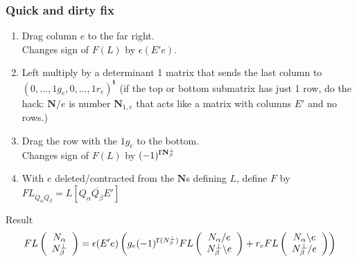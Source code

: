\documentclass{beamer}
\newcommand{\rank}{{\mbox{r}}}%
\begin{document}
\begin{frame}
  \frametitle{Quick and dirty fix}
  \begin{enumerate}
  \item Drag column $e$ to the far right.\\
    Changes sign of $F(L)$ by $\epsilon(E'e)$.
  \item Left multiply by a determinant 1 matrix that sends the last column
    to $(0,...,1g_e,0,...,1r_e)^{\mathbf{t}}$ (if the top or bottom submatrix has just 1 row,
    do the hack: $\mathbf{N}/e$ is number $\mathbf{N}_{1,e}$ that acts like a matrix with
    columns $E'$ and no rows.)
  \item Drag the row with the $1g_e$ to the bottom.\\
    Changes sign of $F(L)$ by $(-1)^{\rank{\mathbf{\NbePe}}}$
  \item With $e$ deleted/contracted from the $\mathbf{N}$s defining $L$, define $F$ by
    $FL_{Q_\alpha \overline{Q_\beta}} = L[Q_\alpha \overline{Q_\beta} E']$
  \end{enumerate}
  \begin{block}{Result}
    \[
    FL\left( \begin{array}{cc} \Nal \\ \NbePe \end{array} \right)
    =
    \epsilon(E'e)\left(
    g_e (-1)^{\rank(\NbePe)}FL \left( \begin{array}{cc} \Nal/e \\ \NbePe\backslash e \end{array} \right)  +
    r_e FL \left( \begin{array}{cc} \Nal\backslash e \\ \NbePe/e \end{array} \right) \right)
    \]
  \end{block}
\end{frame}
\end{document}
